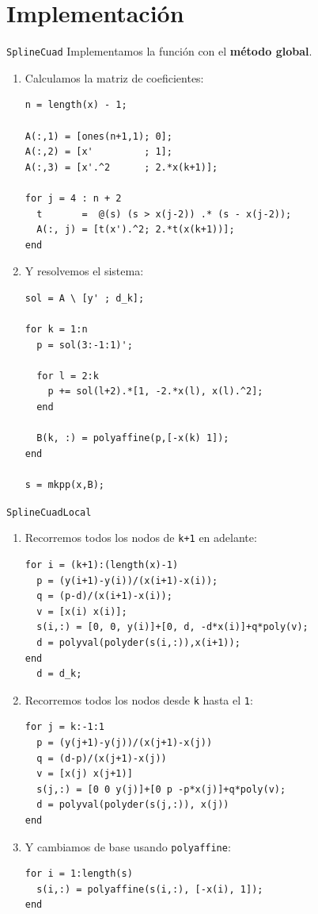 \documentclass[compress]{beamer}
\theoremstyle{definition}
\begin{document}
\section{Implementación}

\begin{frame}[fragile]{\texttt{SplineCuad}}
Implementamos la función con el \textbf{método global}.
\begin{enumerate}[<only@+>]
\item Calculamos la matriz de coeficientes:
\begin{lstlisting}
n = length(x) - 1;

A(:,1) = [ones(n+1,1); 0];
A(:,2) = [x'         ; 1];
A(:,3) = [x'.^2      ; 2.*x(k+1)];

for j = 4 : n + 2
  t       =  @(s) (s > x(j-2)) .* (s - x(j-2));
  A(:, j) = [t(x').^2; 2.*t(x(k+1))];
end
\end{lstlisting}

\item Y resolvemos el sistema:
\begin{lstlisting}
sol = A \ [y' ; d_k];

for k = 1:n
  p = sol(3:-1:1)';

  for l = 2:k
    p += sol(l+2).*[1, -2.*x(l), x(l).^2];
  end

  B(k, :) = polyaffine(p,[-x(k) 1]);
end

s = mkpp(x,B);
\end{lstlisting}
\end{enumerate}
\end{frame}

\begin{frame}[fragile]{\texttt{SplineCuadLocal}}
\begin{enumerate}[<only@+>]

\item Recorremos todos los nodos de \texttt{k+1} en adelante:
\begin{lstlisting}
for i = (k+1):(length(x)-1)
  p = (y(i+1)-y(i))/(x(i+1)-x(i));
  q = (p-d)/(x(i+1)-x(i));
  v = [x(i) x(i)];
  s(i,:) = [0, 0, y(i)]+[0, d, -d*x(i)]+q*poly(v);
  d = polyval(polyder(s(i,:)),x(i+1));
end
  d = d_k;
\end{lstlisting}

\item Recorremos todos los nodos desde \texttt{k} hasta el \texttt{1}:
\begin{lstlisting}
for j = k:-1:1
  p = (y(j+1)-y(j))/(x(j+1)-x(j))
  q = (d-p)/(x(j+1)-x(j))
  v = [x(j) x(j+1)]
  s(j,:) = [0 0 y(j)]+[0 p -p*x(j)]+q*poly(v);
  d = polyval(polyder(s(j,:)), x(j))
end
\end{lstlisting}

\item Y cambiamos de base usando \texttt{polyaffine}:
\begin{lstlisting}
for i = 1:length(s)
  s(i,:) = polyaffine(s(i,:), [-x(i), 1]);
end
\end{lstlisting}
\end{enumerate}
\end{frame}
\end{document}
